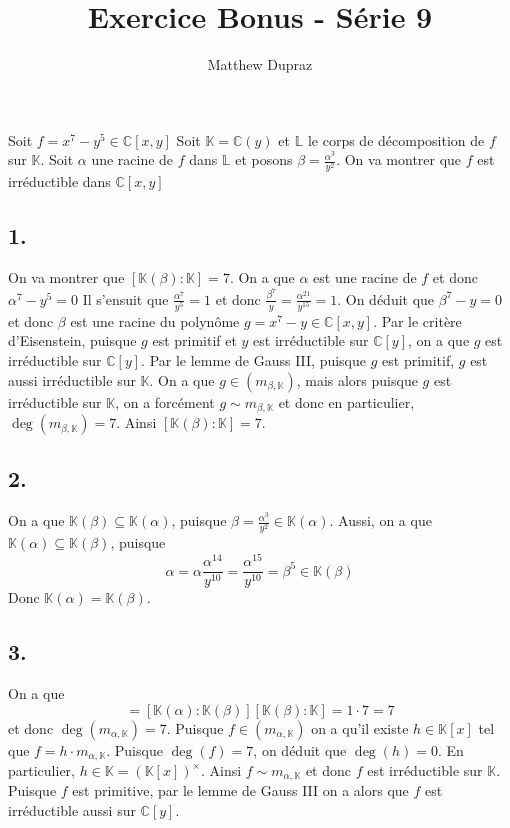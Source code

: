 \documentclass{article}
\author{Matthew Dupraz}
\title{Exercice Bonus - Série 9}
\newcommand{\C}{\mathbb{C}}
\newcommand{\K}{\mathbb{K}}
\renewcommand{\L}{\mathbb{L}}
\begin{document}
\maketitle

Soit $f = x^7 - y^5 \in \C[x, y]$
Soit $\K = \C(y)$ et $\L$ le corps de décomposition de $f$ sur $\K$.
Soit $\alpha$ une racine de $f$ dans $\L$ et posons
$\beta = \frac{\alpha^3}{y^2}$. On va montrer que $f$ est
irréductible dans $\C[x, y]$

\subsection*{1.}

On va montrer que $[\K(\beta): \K] = 7$.
On a que $\alpha$ est une racine de $f$ et donc $\alpha^7 - y^5 = 0$
Il s'ensuit que $\frac{\alpha^7}{y^5} = 1$ et donc
$\frac{\beta^7}{y} = \frac{\alpha^{21}}{y^{15}} = 1$.
On déduit que $\beta^7 - y = 0$ et donc $\beta$ est une
racine du polynôme $g = x^7 - y \in \C[x, y]$.
Par le critère d'Eisenstein, puisque $g$ est primitif et 
$y$ est irréductible sur $\C[y]$, on a que $g$ est irréductible
sur $\C[y]$. Par le lemme de Gauss III, puisque $g$ est primitif,
$g$ est aussi irréductible sur $\K$. On a que
$g \in (m_{\beta, \K})$, mais alors puisque $g$ est irréductible
sur $\K$, on a forcément $g \sim m_{\beta, \K}$ et donc en
particulier, $\deg(m_{\beta, \K}) = 7$.
Ainsi $[\K(\beta): \K] = 7$.

\subsection*{2.}

On a que $\K(\beta) \subseteq \K(\alpha)$, puisque
$\beta = \frac{\alpha^3}{y^2} \in \K(\alpha)$.
Aussi, on a que $\K(\alpha) \subseteq \K(\beta)$, puisque
\begin{equation*}
\alpha = \alpha \frac{\alpha^{14}}{y^{10}}
= \frac{\alpha^{15}}{y^{10}} = \beta^5 \in \K(\beta)
\end{equation*}
Donc $\K(\alpha) = \K(\beta)$.

\subsection*{3.}

On a que
\begin{equation*}
[\K(\alpha):\K] = [\K(\alpha):\K(\beta)][\K(\beta):\K]
= 1\cdot 7 = 7
\end{equation*}
et donc
$\deg(m_{\alpha, \K}) = 7$. Puisque $f \in (m_{\alpha, \K})$
on a qu'il existe $h \in \K[x]$ tel que $f = h\cdot m_{\alpha, \K}$.
Puisque $\deg(f) = 7$, on déduit que $\deg(h) = 0$.
En particulier, $h \in \K = (\K[x])^\times$.
Ainsi $f \sim m_{\alpha, \K}$ et donc $f$ est irréductible sur
$\K$. Puisque $f$ est primitive, par le lemme de Gauss III on a
alors que $f$ est irréductible aussi sur $\C[y]$.

	
\end{document}

